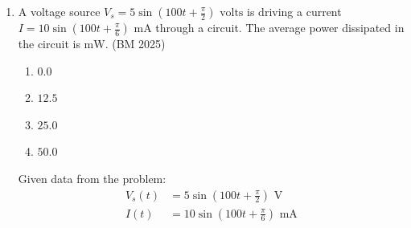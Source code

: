 \begin{enumerate}[label=\thesubsection.\arabic*, ref=\thesubsection.\theenumi]
\hfill  (BM 2025)
\begin{multicols}{4}
\begin{enumerate}
\setlength{\itemsep}{0pt}
    \item $7$
    \item $11$
    \item $9$
    \item $12$
\end{enumerate}
\end{multicols}
\solution
By definition, the median
\begin{align}
a = 3
\end{align}
and 
the mean is
\begin{align}
	\frac{-5 + 1 + a + 5 + b}{5} &= 3
	\\
\implies b = 11
\end{align}
upon substituting $a = 3$. 
The following code verifies the solution.
\begin{lstlisting}
Codes/bm9.py
\end{lstlisting}
\item A voltage source $V_s = 5\sin\left(100t + \frac{\pi}{2}\right)\text{ volts}$ is driving a current $I = 10\sin\left(100t + \frac{\pi}{6}\right)\text{ mA}$ through a circuit. The average power dissipated in the circuit is \underline{\hspace{2cm}} $\text{mW}$.
\hfill  (BM 2025)
\begin{multicols}{4}
\begin{enumerate}
\setlength{\itemsep}{0pt}
    \item $0.0$
    \item $12.5$
    \item $25.0$
    \item $50.0$
\end{enumerate}
\end{multicols}
\solution
Given data from the problem:
\begin{align}
V_s(t) &= 5 \sin\left(100t + \frac{\pi}{2}\right) \text{ V} \\
I(t) &= 10 \sin\left(100t + \frac{\pi}{6}\right) \text{ mA}
\end{align}


\end{enumerate}
